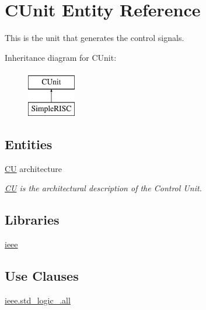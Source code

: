 \hypertarget{class_c_unit}{\section{C\-Unit Entity Reference}
\label{class_c_unit}
}


This is the unit that generates the control signals.  


Inheritance diagram for C\-Unit\-:\begin{figure}[H]
\begin{center}
\leavevmode
\includegraphics[height=2.000000cm]{class_c_unit}
\end{center}
\end{figure}
\subsection*{Entities}
\begin{DoxyCompactItemize}
\item 
\hyperlink{class_c_unit_1_1_c_u}{C\-U} architecture
\begin{DoxyCompactList}\small\item\em \hyperlink{class_c_unit_1_1_c_u}{C\-U} is the architectural description of the Control Unit. \end{DoxyCompactList}\end{DoxyCompactItemize}
\subsection*{Libraries}
 \begin{DoxyCompactItemize}
\item 
\hypertarget{class_c_unit_a0a6af6eef40212dbaf130d57ce711256}{\hyperlink{class_c_unit_a0a6af6eef40212dbaf130d57ce711256}{ieee} }\label{class_c_unit_a0a6af6eef40212dbaf130d57ce711256}

\end{DoxyCompactItemize}
\subsection*{Use Clauses}
 \begin{DoxyCompactItemize}
\item 
\hypertarget{class_c_unit_a43ecb358105806229eb7a3074fc4d577}{\hyperlink{class_c_unit_a43ecb358105806229eb7a3074fc4d577}{ieee.\-std\-\_\-logic\-\_.\-all}   }\label{class_c_unit_a43ecb358105806229eb7a3074fc4d577}

\end{DoxyCompactItemize}
